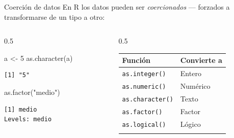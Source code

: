 \documentclass[
  9pt,
  ignorenonframetext,
]{beamer}
\newenvironment{Shaded}{\begin{snugshade}}{\end{snugshade}}
\newcommand{\DecValTok}[1]{\textcolor[rgb]{0.68,0.00,0.00}{#1}}
\newcommand{\FunctionTok}[1]{\textcolor[rgb]{0.28,0.35,0.67}{#1}}
\newcommand{\NormalTok}[1]{\textcolor[rgb]{0.00,0.23,0.31}{#1}}
\newcommand{\OtherTok}[1]{\textcolor[rgb]{0.00,0.23,0.31}{#1}}
\newcommand{\StringTok}[1]{\textcolor[rgb]{0.13,0.47,0.30}{#1}}
\begin{document}
\begin{frame}[fragile]{Coerción de datos}
\label{coerciuxf3n-de-datos}
En R los datos pueden ser \emph{coercionados} --- forzados a
transformarse de un tipo a otro:

\begin{columns}[T]
\begin{column}{0.5\textwidth}
\begin{Shaded}
\begin{Highlighting}[]
\NormalTok{a }\OtherTok{\textless{}{-}} \DecValTok{5}
\FunctionTok{as.character}\NormalTok{(a)}
\end{Highlighting}
\end{Shaded}

\begin{verbatim}
[1] "5"
\end{verbatim}

\begin{Shaded}
\begin{Highlighting}[]
\FunctionTok{as.factor}\NormalTok{(}\StringTok{"medio"}\NormalTok{)}
\end{Highlighting}
\end{Shaded}

\begin{verbatim}
[1] medio
Levels: medio
\end{verbatim}
\end{column}

\begin{column}{0.5\textwidth}
\begin{longtable}[]{@{}ll@{}}
\toprule\noalign{}
Función & Convierte a \\
\midrule\noalign{}
\endhead
\texttt{as.integer()} & Entero \\
\texttt{as.numeric()} & Numérico \\
\texttt{as.character()} & Texto \\
\texttt{as.factor()} & Factor \\
\texttt{as.logical()} & Lógico \\
\bottomrule\noalign{}
\end{longtable}
\end{column}
\end{columns}
\end{frame}
\end{document}
